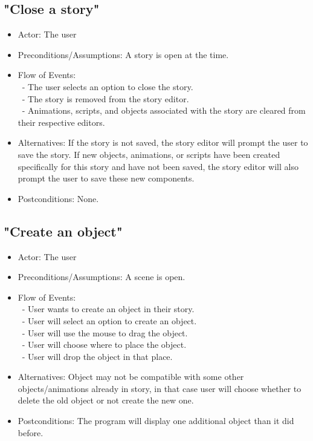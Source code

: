 \documentclass[12pt]{article}
\begin{document}
		\subsection{"Close a story"}
\begin{itemize}
	\item Actor: The user
		\item Preconditions/Assumptions: A story is open at the time.
	\item Flow of Events: \\
	\	- The user selects an option to close the story. \\
	\	- The story is removed from the story editor. \\
	\	- Animations, scripts, and objects associated with the story are cleared from their respective editors.
	\item Alternatives: If the story is not saved, the story editor will prompt the user to
	save the story. If new objects, animations, or scripts have been created specifically for this
	story and have not been saved, the story editor will also prompt the user to save these
	new components.
	\item Postconditions: None.
\end{itemize}
	
	\subsection{"Create an object"}
\begin{itemize}
	\item Actor: The user
	\item Preconditions/Assumptions: A scene is open. 
	\item Flow of Events: \\
	 	\ - User wants to create an object in their story. \\
		\ - User will select an option to create an object. \\
		\ - User will use the mouse to drag the object. \\
		\ - User will choose where to place the object. \\
		\ - User will drop the object in that place.
	\item Alternatives: Object may not be compatible with some other objects/animations already in story, in that case user will choose whether to delete the old object or not create the new one.
	\item Postconditions: The program will display one additional object than it did before.
\end{itemize}
\end{document}
